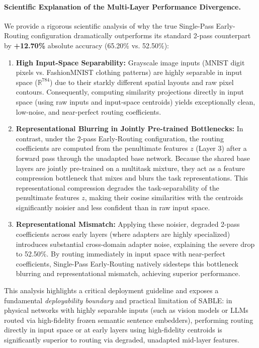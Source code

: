 \paragraph{Scientific Explanation of the Multi-Layer Performance Divergence.} We provide a rigorous scientific analysis of why the true Single-Pass Early-Routing configuration dramatically outperforms its standard 2-pass counterpart by \textbf{+12.70\%} absolute accuracy (65.20\% vs. 52.50\%):
\begin{enumerate}
    \item \textbf{High Input-Space Separability:} Grayscale image inputs (MNIST digit pixels vs. FashionMNIST clothing patterns) are highly separable in input space ($\mathbb{R}^{784}$) due to their starkly different spatial layouts and raw pixel contours. Consequently, computing similarity projections directly in input space (using raw inputs and input-space centroids) yields exceptionally clean, low-noise, and near-perfect routing coefficients.
    \item \textbf{Representational Blurring in Jointly Pre-trained Bottlenecks:} In contrast, under the 2-pass Early-Routing configuration, the routing coefficients are computed from the penultimate features $z$ (Layer 3) after a forward pass through the unadapted base network. Because the shared base layers are jointly pre-trained on a multitask mixture, they act as a feature compression bottleneck that mixes and blurs the task representations. This representational compression degrades the task-separability of the penultimate features $z$, making their cosine similarities with the centroids significantly noisier and less confident than in raw input space. 
    \item \textbf{Representational Mismatch:} Applying these noisier, degraded 2-pass coefficients across early layers (where adapters are highly specialized) introduces substantial cross-domain adapter noise, explaining the severe drop to 52.50\%. By routing immediately in input space with near-perfect coefficients, Single-Pass Early-Routing natively sidesteps this bottleneck blurring and representational mismatch, achieving superior performance.
\end{enumerate}
This analysis highlights a critical deployment guideline and exposes a fundamental \emph{deployability boundary} and practical limitation of SABLE: in physical networks with highly separable inputs (such as vision models or LLMs routed via high-fidelity frozen semantic sentence embedders), performing routing directly in input space or at early layers using high-fidelity centroids is significantly superior to routing via degraded, unadapted mid-layer features. 


